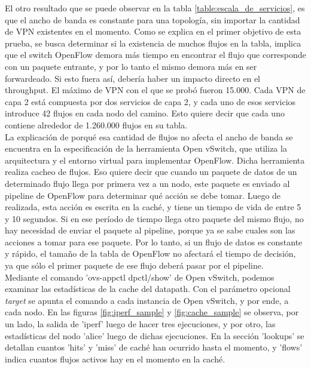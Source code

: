 El otro resultado que se puede observar en la tabla \ref{table:escala_de_servicios}, es que el ancho de banda es constante para una topología, sin importar la cantidad de VPN existentes en el momento. Como se explica en el primer objetivo de esta prueba, se busca determinar si la existencia de muchos flujos en la tabla, implica que el switch OpenFlow demora más tiempo en encontrar el flujo que corresponde con un paquete entrante, y por lo tanto el mismo demora más en ser forwardeado. Si esto fuera así, debería haber un impacto directo en el throughput. El máximo de VPN con el que se probó fueron 15.000. Cada VPN de capa 2 está compuesta por dos servicios de capa 2, y cada uno de esos servicios introduce 42 flujos en cada nodo del camino. Esto quiere decir que cada uno contiene alrededor de 1.260.000 flujos en su tabla. \\
La explicación de porqué esa cantidad de flujos no afecta el ancho de banda se encuentra en la especificación de la herramienta Open vSwitch, que utiliza la arquitectura y el entorno virtual para implementar OpenFlow. Dicha herramienta realiza cacheo de flujos. Eso quiere decir que cuando un paquete de datos de un determinado flujo llega por primera vez a un nodo, este paquete es enviado al pipeline de OpenFlow para determinar qué acción se debe tomar. Luego de realizada, esta acción es escrita en la caché, y tiene un tiempo de vida de entre 5 y 10 segundos. Si en ese período de tiempo llega otro paquete del mismo flujo, no hay necesidad de enviar el paquete al pipeline, porque ya se sabe cuales son las acciones a tomar para ese paquete. Por lo tanto, si un flujo de datos es constante y rápido, el tamaño de la tabla de OpenFlow no afectará el tiempo de decisión, ya que sólo el primer paquete de ese flujo deberá pasar por el pipeline. \\
Mediante el comando 'ovs-appctl dpctl/show' de Open vSwitch, podemos examinar las estadísticas de la cache del datapath. Con el parámetro opcional \textit{target} se apunta el comando a cada instancia de Open vSwitch, y por ende, a cada nodo. En las figuras \ref{fig:iperf_sample} y \ref{fig:cache_sample} se observa, por un lado, la salida de 'iperf' luego de hacer tres ejecuciones, y por otro, las estadísticas del nodo 'alice' luego de dichas ejecuciones. En la sección 'lookups' se detallan cuantos 'hits' y 'miss' de caché han ocurrido hasta el momento, y 'flows' indica cuantos flujos activos hay en el momento en la caché. \\ \\

